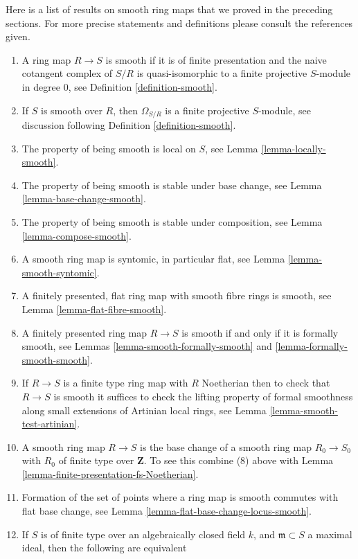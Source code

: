 \noindent
Here is a list of results on smooth ring maps that we
proved in the preceding sections. For more precise statements
and definitions please consult the references given.
\begin{enumerate}
\item A ring map $R \to S$ is smooth if it is of finite presentation
and the naive cotangent complex of $S/R$ is quasi-isomorphic to
a finite projective $S$-module in degree $0$, see
Definition \ref{definition-smooth}.
\item If $S$ is smooth over $R$, then $\Omega_{S/R}$ is a finite projective
$S$-module, see discussion following Definition \ref{definition-smooth}.
\item The property of being smooth is local on $S$, see
Lemma \ref{lemma-locally-smooth}.
\item The property of being smooth is stable under base change, see
Lemma \ref{lemma-base-change-smooth}.
\item The property of being smooth is stable under composition, see
Lemma \ref{lemma-compose-smooth}.
\item A smooth ring map is syntomic, in particular flat, see
Lemma \ref{lemma-smooth-syntomic}.
\item A finitely presented, flat ring map with smooth fibre rings
is smooth, see Lemma \ref{lemma-flat-fibre-smooth}.
\item A finitely presented ring map $R \to S$ is smooth if and
only if it is formally smooth, see
Lemmas \ref{lemma-smooth-formally-smooth} and
\ref{lemma-formally-smooth-smooth}.
\item If $R \to S$ is a finite type ring map with $R$ Noetherian
then to check that $R \to S$ is smooth it suffices to check the lifting
property of formal smoothness along small extensions of Artinian
local rings, see Lemma \ref{lemma-smooth-test-artinian}.
\item A smooth ring map $R \to S$ is the base change
of a smooth ring map $R_0 \to S_0$
with $R_0$ of finite type over $\mathbf{Z}$. To see this
combine (8) above with Lemma \ref{lemma-finite-presentation-fs-Noetherian}.
\item Formation of the set of points where a
ring map is smooth commutes with flat base change, see
Lemma \ref{lemma-flat-base-change-locus-smooth}.
\item If $S$ is of finite type over an algebraically closed
field $k$, and $\mathfrak m \subset S$ a maximal ideal,
then the following are equivalent
\begin{enumerate}

\end{enumerate}
\end{enumerate}
